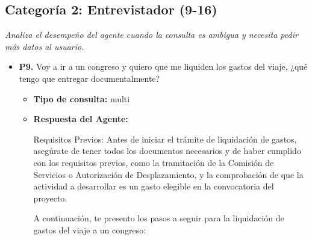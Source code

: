 \documentclass{article}
\begin{document}
\subsection{Categoría 2: Entrevistador (9-16)}
\textit{Analiza el desempeño del agente cuando la consulta es ambigua y necesita pedir más datos al usuario.}
\begin{itemize}
      \item \textbf{P9.} Voy a ir a un congreso y quiero que me liquiden los gastos del viaje, ¿qué tengo que entregar documentalmente? \\
            \begin{itemize}
                  \item \textbf{Tipo de consulta:} multi
                  \item \textbf{Respuesta del Agente:}

                        Requisitos Previos:
                        Antes de iniciar el trámite de liquidación de gastos, asegúrate de tener todos los documentos necesarios y de haber cumplido con los requisitos previos, como la tramitación de la Comisión de Servicios o Autorización de Desplazamiento, y la comprobación de que la actividad a desarrollar es un gasto elegible en la convocatoria del proyecto.

                        A continuación, te presento los pasos a seguir para la liquidación de gastos del viaje a un congreso:


\end{itemize}
\end{itemize}
\end{document}

